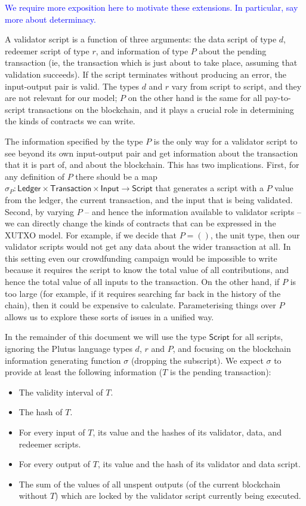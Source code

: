 \documentclass[a4paper]{article}
\newcommand{\blue}[1]{\textcolor{blue}{#1}}
\theoremstyle{definition}  %
\begin{document}
\noindent\blue{We require more exposition here to motivate these
  extensions.  In particular, say more about determinacy.}

A validator script is a function of three arguments: the data script
of type $d$, redeemer script of type $r$, and information of type $P$
about the pending transaction (ie, the transaction which is
  just about to take place, assuming that validation succeeds).  If
the script terminates without producing an error, the input-output
pair is valid. The types $d$ and $r$ vary from script to script, and
they are not relevant for our model; $P$ on the other hand is the same
for all pay-to-script transactions on the blockchain, and it plays a
crucial role in determining the kinds of contracts we can write.

The information specified by the type $P$ is the only way for a
validator script to see beyond its own input-output pair and get
information about the transaction that it is part of, and about the
blockchain. This has two implications. First, for any definition of
$P$ there should be a map $\sigma_P : \mathsf{Ledger} \times
\mathsf{Transaction} \times \mathsf{Input} \rightarrow
\mathsf{Script}$ that generates a script with a $P$ value from the
ledger, the current transaction, and the input that is being
validated. Second, by varying $P$ -- and hence the information
available to validator scripts -- we can directly change the kinds of
contracts that can be expressed in the XUTXO model. For example, if we
decide that $P = ()$, the unit type, then our validator scripts would
not get any data about the wider transaction at all. In this setting
even our crowdfunding campaign would be impossible to write because it
requires the script to know the total value of all contributions, and
hence the total value of all inputs to the transaction.  On the other
hand, if $P$ is too large (for example, if it requires searching far
back in the history of the chain), then it could be expensive to
calculate.  Parameterising things over $P$ allows us to explore these
sorts of issues in a unified way.

In the remainder of this document we will use the type
$\mathsf{Script}$ for all scripts, ignoring the Plutus language types
$d$, $r$ and $P$, and focusing on the blockchain information
generating function $\sigma$ (dropping the subscript).  We expect
$\sigma$ to provide at least the following information ($T$ is the
pending transaction):

\begin{itemize}
  
\item The validity interval of $T$.
\item The hash of $T$.
\item For every input of $T$, its value and the hashes of its
  validator, data, and redeemer scripts.
\item For every output of $T$, its value and the hash of its validator and
  data script.
\item The sum of the values of all unspent outputs (of the current
  blockchain without $T$) which are locked by the validator
  script currently being executed.
\end{itemize}
\end{document}

